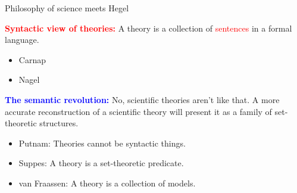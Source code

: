 \documentclass[8pt]{beamer}
\subtitle{or, how might you best formalize a scientific theory, were you inclined to do so?}
\author{Hans Halvorson and Jim Weatherall}
\date{September 8, 2013} \usetheme{Copenhagen}
\begin{document}
\def\2{\mathcal}
\def\7{\mathbb}
\newenvironment{proenv}{\only{\setbeamercolor{local structure}{fg=green}}}{}
\newenvironment{conenv}{\only{\setbeamercolor{local structure}{fg=red}}}{}  
\newenvironment{neuenv}{\only{\setbeamercolor{local
      structure}{fg=yellow}}}{}



\begin{frame}

\maketitle


\end{frame}

\begin{frame}{Philosophy of science meets Hegel}

\textcolor{red}{\bf Syntactic view of theories:} A theory is a
  collection of \textcolor{red}{sentences} in a formal language.

\smallskip
\begin{itemize}
\item Carnap
\item Nagel
\end{itemize}

\bigskip \bigskip \textcolor{blue}{\bf The semantic revolution:} No,
scientific theories aren't like that.  A more accurate reconstruction
of a scientific theory will present it as a family of set-theoretic
structures.  \smallskip
\begin{itemize} 
\item Putnam: Theories cannot be syntactic things.
\item Suppes: A theory is a set-theoretic predicate.
\item van Fraassen: A theory is a collection of models.
\end{itemize}

\end{frame}
\end{document}
